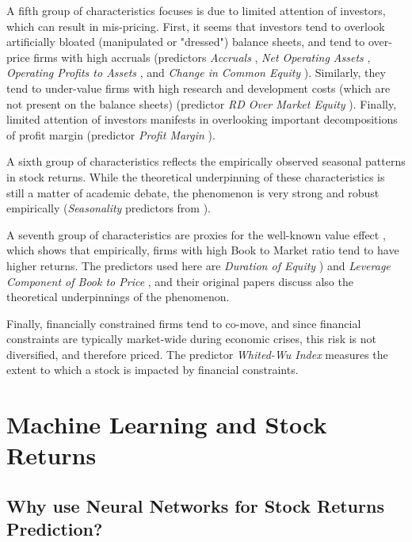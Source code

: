 			A fifth group of characteristics focuses is due to limited attention of investors, which can result in mis-pricing. First, it seems that investors tend to overlook artificially bloated (manipulated or "dressed") balance sheets, and tend to over-price firms with high accruals (predictors \textit{Accruals} \citep{sloan1996create}, \textit{Net Operating Assets} \citep{hirshleifer2004investors}, \textit{Operating Profits to Assets} \citep{ball2016accruals}, and \textit{Change in Common Equity} \cite{richardson2006implications}). Similarly, they tend to under-value firms with high research and development costs (which are not present on the balance sheets) (predictor \textit{ RD Over Market Equity} \cite{chan2001stock}). Finally, limited attention of investors manifests in overlooking important decompositions of profit margin (predictor \textit{Profit Margin} \cite{soliman2008use}).
			
			A sixth group of characteristics reflects the empirically observed seasonal patterns in stock returns. While the theoretical underpinning of these characteristics is still a matter of academic debate, the phenomenon is very strong and robust empirically (\textit{Seasonality} predictors from \cite{heston2008seasonality}). 
 			
 			A seventh group of characteristics are proxies for the well-known value effect \cite{fama1993common}, which shows that empirically, firms with high Book to Market ratio tend to have higher returns. The predictors used here are \textit{ Duration of Equity }\citep{dechow2004implied}) and \textit{Leverage Component of Book to Price} \citep{penman2007book}, and their original papers discuss also the theoretical underpinnings of the phenomenon.
 			
 			Finally, financially constrained firms tend to co-move, and since financial constraints are typically market-wide during economic crises, this risk is not diversified, and therefore priced. The predictor \textit{Whited-Wu Index} \citep{whited2006financial} measures the extent to which a stock is impacted by financial constraints.  
			
		\section{Machine Learning and Stock Returns}		
		
		\subsection{Why use Neural Networks for Stock Returns Prediction?}
			
